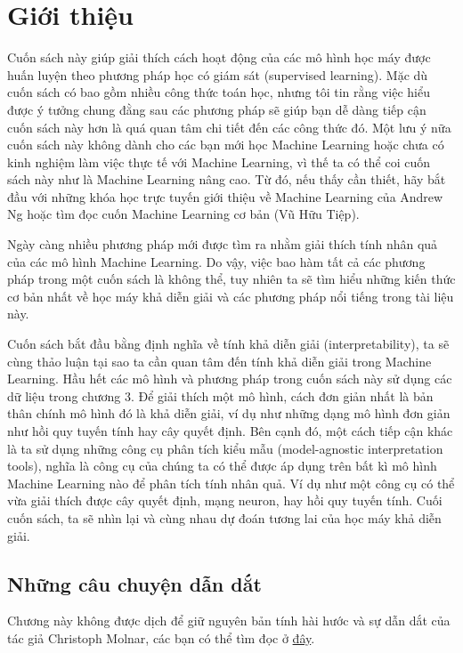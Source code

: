 \chapter{Giới thiệu}
Cuốn sách này giúp giải thích cách hoạt động của các mô hình học máy được huấn luyện theo phương pháp học có giám sát (supervised learning). Mặc dù cuốn sách có bao gồm nhiều công thức toán học, nhưng tôi tin rằng việc hiểu được ý tưởng chung đằng sau các phương pháp sẽ giúp bạn dễ dàng tiếp cận cuốn sách này hơn là quá quan tâm chi tiết đến các công thức đó. Một lưu ý nữa cuốn sách này không dành cho các bạn mới học Machine Learning hoặc chưa có kinh nghiệm làm việc thực tế với Machine Learning, vì thế ta có thể coi cuốn sách này như là Machine Learning nâng cao. Từ đó, nếu thấy cần thiết, hãy bắt đầu với những khóa học trực tuyến giới thiệu về Machine Learning của Andrew Ng hoặc tìm đọc cuốn Machine Learning cơ bản (Vũ Hữu Tiệp).

Ngày càng nhiều phương pháp mới được tìm ra nhằm giải thích tính nhân quả của các mô hình Machine Learning. Do vậy, việc bao hàm tất cả các phương pháp trong một cuốn sách là không thể, tuy nhiên ta sẽ tìm hiểu những kiến thức cơ bản nhất về học máy khả diễn giải và các phương pháp nổi tiếng trong tài liệu này.

Cuốn sách bắt đầu bằng định nghĩa về tính khả diễn giải (interpretability), ta sẽ cùng thảo luận tại sao ta cần quan tâm đến tính khả diễn giải trong Machine Learning. Hầu hết các mô hình và phương pháp trong cuốn sách này sử dụng các dữ liệu trong chương 3. Để giải thích một mô hình, cách đơn giản nhất là bản thân chính mô hình đó là khả diễn giải, ví dụ như những dạng mô hình đơn giản như hồi quy tuyến tính hay cây quyết định. Bên cạnh đó, một cách tiếp cận khác là ta sử dụng những công cụ phân tích kiểu mẫu (model-agnostic interpretation tools), nghĩa là công cụ của chúng ta có thể được áp dụng trên bất kì mô hình Machine Learning nào để phân tích tính nhân quả. Ví dụ như một công cụ có thể vừa giải thích được cây quyết định, mạng neuron, hay hồi quy tuyến tính. Cuối cuốn sách, ta sẽ nhìn lại và cùng nhau dự đoán tương lai của học máy khả diễn giải.

\section{Những câu chuyện dẫn dắt}
Chương này không được dịch để giữ nguyên bản tính hài hước và sự dẫn dắt của tác giả Christoph Molnar, các bạn có thể tìm đọc ở \href{https://christophm.github.io/interpretable-ml-book/storytime.html}{đây}.

